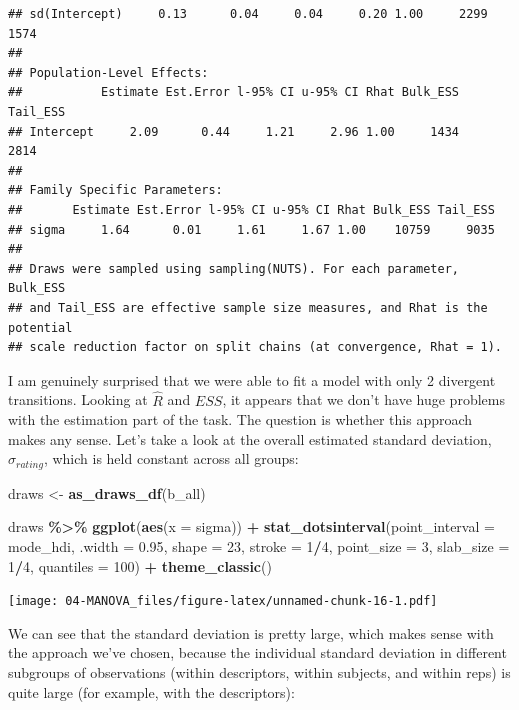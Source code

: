 \documentclass[
]{book}
\newenvironment{Shaded}{\begin{snugshade}}{\end{snugshade}}
\newcommand{\AttributeTok}[1]{\textcolor[rgb]{0.13,0.29,0.53}{#1}}
\newcommand{\DecValTok}[1]{\textcolor[rgb]{0.00,0.00,0.81}{#1}}
\newcommand{\FloatTok}[1]{\textcolor[rgb]{0.00,0.00,0.81}{#1}}
\newcommand{\FunctionTok}[1]{\textcolor[rgb]{0.13,0.29,0.53}{\textbf{#1}}}
\newcommand{\NormalTok}[1]{#1}
\newcommand{\OtherTok}[1]{\textcolor[rgb]{0.56,0.35,0.01}{#1}}
\newcommand{\SpecialCharTok}[1]{\textcolor[rgb]{0.81,0.36,0.00}{\textbf{#1}}}
\begin{document}
\begin{verbatim}
## sd(Intercept)     0.13      0.04     0.04     0.20 1.00     2299     1574
## 
## Population-Level Effects: 
##           Estimate Est.Error l-95% CI u-95% CI Rhat Bulk_ESS Tail_ESS
## Intercept     2.09      0.44     1.21     2.96 1.00     1434     2814
## 
## Family Specific Parameters: 
##       Estimate Est.Error l-95% CI u-95% CI Rhat Bulk_ESS Tail_ESS
## sigma     1.64      0.01     1.61     1.67 1.00    10759     9035
## 
## Draws were sampled using sampling(NUTS). For each parameter, Bulk_ESS
## and Tail_ESS are effective sample size measures, and Rhat is the potential
## scale reduction factor on split chains (at convergence, Rhat = 1).
\end{verbatim}

I am genuinely surprised that we were able to fit a model with only 2 divergent transitions. Looking at \(\hat{R}\) and \(ESS\), it appears that we don't have huge problems with the estimation part of the task. The question is whether this approach makes any sense. Let's take a look at the overall estimated standard deviation, \(\sigma_{rating}\), which is held constant across all groups:

\begin{Shaded}
\begin{Highlighting}[]
\NormalTok{draws }\OtherTok{\textless{}{-}} \FunctionTok{as\_draws\_df}\NormalTok{(b\_all)}

\NormalTok{draws }\SpecialCharTok{\%\textgreater{}\%} 
  \FunctionTok{ggplot}\NormalTok{(}\FunctionTok{aes}\NormalTok{(}\AttributeTok{x =}\NormalTok{ sigma)) }\SpecialCharTok{+} 
  \FunctionTok{stat\_dotsinterval}\NormalTok{(}\AttributeTok{point\_interval =}\NormalTok{ mode\_hdi, }\AttributeTok{.width =} \FloatTok{0.95}\NormalTok{,}
                    \AttributeTok{shape =} \DecValTok{23}\NormalTok{, }\AttributeTok{stroke =} \DecValTok{1}\SpecialCharTok{/}\DecValTok{4}\NormalTok{, }\AttributeTok{point\_size =} \DecValTok{3}\NormalTok{, }\AttributeTok{slab\_size =} \DecValTok{1}\SpecialCharTok{/}\DecValTok{4}\NormalTok{,}
                    \AttributeTok{quantiles =} \DecValTok{100}\NormalTok{) }\SpecialCharTok{+} 
  \FunctionTok{theme\_classic}\NormalTok{()}
\end{Highlighting}
\end{Shaded}

\texttt{[image: 04-MANOVA\_files/figure-latex/unnamed-chunk-16-1.pdf]}

We can see that the standard deviation is pretty large, which makes sense with the approach we've chosen, because the individual standard deviation in different subgroups of observations (within descriptors, within subjects, and within reps) is quite large (for example, with the descriptors):
\end{document}
